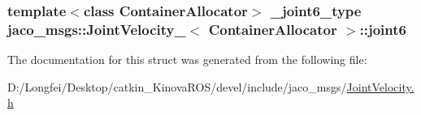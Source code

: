 \subsubsection[{\texorpdfstring{joint6}{joint6}}]{\setlength{\rightskip}{0pt plus 5cm}template$<$class Container\+Allocator$>$ {\bf \+\_\+joint6\+\_\+type} {\bf jaco\+\_\+msgs\+::\+Joint\+Velocity\+\_\+}$<$ Container\+Allocator $>$\+::joint6}\hypertarget{structjaco__msgs_1_1JointVelocity___ac4597081b297a5080198455fc6f13090}{}\label{structjaco__msgs_1_1JointVelocity___ac4597081b297a5080198455fc6f13090}


The documentation for this struct was generated from the following file\+:\begin{DoxyCompactItemize}
\item 
D\+:/\+Longfei/\+Desktop/catkin\+\_\+\+Kinova\+R\+O\+S/devel/include/jaco\+\_\+msgs/\hyperlink{JointVelocity_8h}{Joint\+Velocity.\+h}\end{DoxyCompactItemize}
